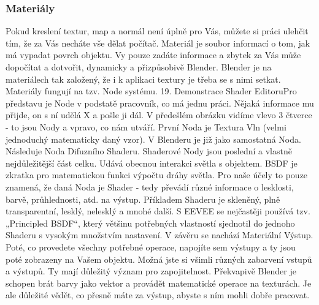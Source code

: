 \documentclass[12pt,a4paper]{report}
\begin{document}
	\subsubsection{Materiály}
	\label{section:materials}
	Pokud kreslení textur, map a normál není úplně pro Vás, můžete si práci
	ulehčit tím, že za Vás necháte vše dělat počítač. Materiál je soubor
	informací o tom, jak má vypadat povrch objektu. Vy pouze zadáte
	informace a zbytek za Vás může dopočítat a dotvořit, dynamicky
	a přizpůsobivě Blender. Blender je na materiálech tak založený, že i k
	aplikaci textury je třeba se s nimi setkat. Materiály fungují na tzv. Node
	systému.
	19. Demonstrace Shader EditoruPro představu je Node v podstatě pracovník, co má jednu práci. Nějaká
	informace mu přijde, on s ní udělá X a pošle ji dál. V předešlém obrázku
	vidíme vlevo 3 čtverce - to jsou Nody a vpravo, co nám utváří. První Noda
	je Textura Vln (velmi jednoduchý matematicky daný vzor). V Blenderu je
	již jako samostatná Noda. Následuje Noda Difuzního Shaderu. Shaderové
	Nody jsou poslední a vlastně nejdůležitější část celku. Udává obecnou
	interakci světla s objektem. BSDF je zkratka pro matematickou funkci
	výpočtu dráhy světla. Pro naše účely to pouze znamená, že daná Noda je
	Shader - tedy převádí různé informace o lesklosti, barvě, průhlednosti,
	atd. na výstup. Příkladem Shaderu je skleněný, plně transparentní, lesklý,
	nelesklý a mnohé další. S EEVEE se nejčastěji používá tzv. „Principled
	BSDF“, který většinu potřebných vlastností sjednotil do jednoho Shaderu
	s vysokým množstvím nastavení. V závěru se nachází Materiální Výstup.
	Poté, co provedete všechny potřebné operace, napojíte sem výstupy a ty
	jsou poté zobrazeny na Vašem objektu.
	Možná jste si všimli různých zabarvení vstupů a výstupů. Ty mají důležitý
	význam pro zapojitelnost. Překvapivě Blender je schopen brát barvy jako
	vektor a provádět matematické operace na texturách. Je ale důležité
	vědět, co přesně máte za výstup, abyste s ním mohli dobře pracovat.
\end{document}
